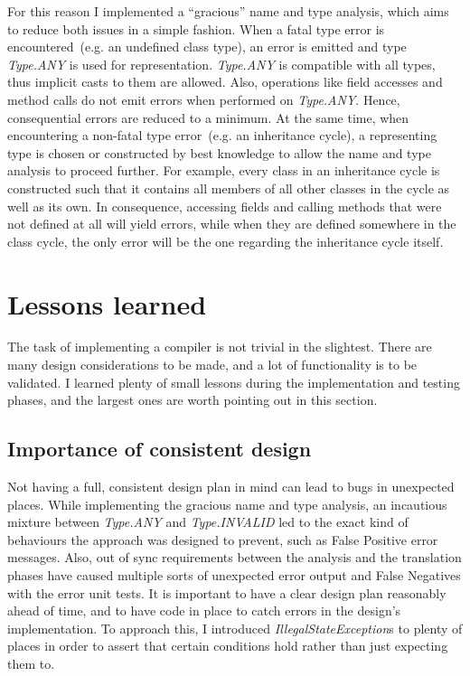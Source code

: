 \documentclass[]{tukportfolio}
\begin{document}
For this reason I implemented a ``gracious'' name and type analysis, which aims to reduce both issues in a simple fashion. When a fatal type error is encountered~(e.g. an undefined class type), an error is emitted and type \textit{Type.ANY} is used for representation. \textit{Type.ANY} is compatible with all types, thus implicit casts to them are allowed. Also, operations like field accesses and method calls do not emit errors when performed on \textit{Type.ANY}. Hence, consequential errors are reduced to a minimum. At the same time, when encountering a non-fatal type error~(e.g. an inheritance cycle), a representing type is chosen or constructed by best knowledge to allow the name and type analysis to proceed further. For example, every class in an inheritance cycle is constructed such that it contains all members of all other classes in the cycle as well as its own. In consequence, accessing fields and calling methods that were not defined at all will yield errors, while when they are defined somewhere in the class cycle, the only error will be the one regarding the inheritance cycle itself.

\section{Lessons learned}

The task of implementing a compiler is not trivial in the slightest. There are many design considerations to be made, and a lot of functionality is to be validated. I learned plenty of small lessons during the implementation and testing phases, and the largest ones are worth pointing out in this section.

\subsection{Importance of consistent design}

Not having a full, consistent design plan in mind can lead to bugs in unexpected places. While implementing the gracious name and type analysis, an incautious mixture between \textit{Type.ANY} and \textit{Type.INVALID} led to the exact kind of behaviours the approach was designed to prevent, such as False Positive error messages. Also, out of sync requirements between the analysis and the translation phases have caused multiple sorts of unexpected error output and False Negatives with the error unit tests. It is important to have a clear design plan reasonably ahead of time, and to have code in place to catch errors in the design's implementation. To approach this, I introduced \textit{IllegalStateException}s to plenty of places in order to assert that certain conditions hold rather than just expecting them to.
\end{document}
